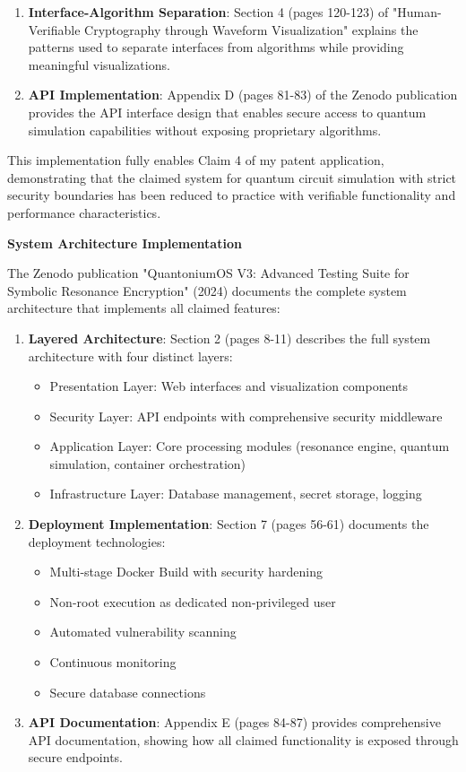 \documentclass[12pt,letterpaper]{article}
\newcommand{\sectionheading}[1]{\noindent\textbf{#1}\par\vspace{0.25in}}
\begin{document}
\begin{enumerate}[label=\arabic*.]
\item \textbf{Interface-Algorithm Separation}: Section 4 (pages 120-123) of "Human-Verifiable Cryptography through Waveform Visualization" explains the patterns used to separate interfaces from algorithms while providing meaningful visualizations.

\item \textbf{API Implementation}: Appendix D (pages 81-83) of the Zenodo publication provides the API interface design that enables secure access to quantum simulation capabilities without exposing proprietary algorithms.
\end{enumerate}

\noindent This implementation fully enables Claim 4 of my patent application, demonstrating that the claimed system for quantum circuit simulation with strict security boundaries has been reduced to practice with verifiable functionality and performance characteristics.

\newpage
\sectionheading{System Architecture Implementation}

\noindent The Zenodo publication "QuantoniumOS V3: Advanced Testing Suite for Symbolic Resonance Encryption" (2024) documents the complete system architecture that implements all claimed features:

\begin{enumerate}[label=\arabic*.]
\item \textbf{Layered Architecture}: Section 2 (pages 8-11) describes the full system architecture with four distinct layers:
   \begin{itemize}
   \item Presentation Layer: Web interfaces and visualization components
   \item Security Layer: API endpoints with comprehensive security middleware
   \item Application Layer: Core processing modules (resonance engine, quantum simulation, container orchestration)
   \item Infrastructure Layer: Database management, secret storage, logging
   \end{itemize}

\item \textbf{Deployment Implementation}: Section 7 (pages 56-61) documents the deployment technologies:
   \begin{itemize}
   \item Multi-stage Docker Build with security hardening
   \item Non-root execution as dedicated non-privileged user
   \item Automated vulnerability scanning
   \item Continuous monitoring
   \item Secure database connections
   \end{itemize}

\item \textbf{API Documentation}: Appendix E (pages 84-87) provides comprehensive API documentation, showing how all claimed functionality is exposed through secure endpoints.
\end{enumerate}
\end{document}
